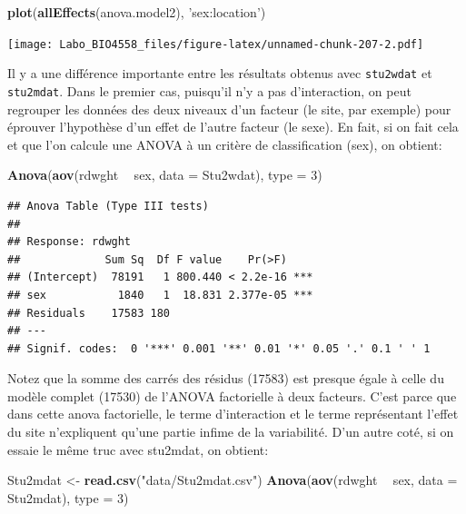 \documentclass[12pt,]{book}
\newenvironment{Shaded}{\begin{snugshade}}{\end{snugshade}}
\newcommand{\DataTypeTok}[1]{\textcolor[rgb]{0.27,0.27,0.27}{#1}}
\newcommand{\DecValTok}[1]{\textcolor[rgb]{0.06,0.06,0.06}{#1}}
\newcommand{\KeywordTok}[1]{\textcolor[rgb]{0.27,0.27,0.27}{\textbf{#1}}}
\newcommand{\NormalTok}[1]{#1}
\newcommand{\OperatorTok}[1]{\textcolor[rgb]{0.43,0.43,0.43}{\textbf{#1}}}
\newcommand{\StringTok}[1]{\textcolor[rgb]{0.5,0.5,0.5}{#1}}
\begin{document}
\begin{Shaded}
\begin{Highlighting}[]
\KeywordTok{plot}\NormalTok{(}\KeywordTok{allEffects}\NormalTok{(anova.model2), }\StringTok{'sex:location'}\NormalTok{)}
\end{Highlighting}
\end{Shaded}

\texttt{[image: Labo\_BIO4558\_files/figure-latex/unnamed-chunk-207-2.pdf]}

Il y a une différence importante entre les résultats obtenus avec \texttt{stu2wdat} et \texttt{stu2mdat}. Dans le premier cas, puisqu'il n'y a pas d'interaction, on peut regrouper les données des deux niveaux d'un facteur (le site, par exemple) pour éprouver l'hypothèse d'un effet de l'autre facteur (le sexe). En fait, si on fait cela et que l'on calcule une ANOVA à un critère de classification (sex), on obtient:

\begin{Shaded}
\begin{Highlighting}[]
\KeywordTok{Anova}\NormalTok{(}\KeywordTok{aov}\NormalTok{(rdwght }\OperatorTok{~}\StringTok{ }\NormalTok{sex, }\DataTypeTok{data =}\NormalTok{ Stu2wdat), }\DataTypeTok{type =} \DecValTok{3}\NormalTok{)}
\end{Highlighting}
\end{Shaded}

\begin{verbatim}
## Anova Table (Type III tests)
## 
## Response: rdwght
##             Sum Sq  Df F value    Pr(>F)    
## (Intercept)  78191   1 800.440 < 2.2e-16 ***
## sex           1840   1  18.831 2.377e-05 ***
## Residuals    17583 180                      
## ---
## Signif. codes:  0 '***' 0.001 '**' 0.01 '*' 0.05 '.' 0.1 ' ' 1
\end{verbatim}

Notez que la somme des carrés des résidus (17583) est presque égale à celle du modèle complet (17530) de l'ANOVA factorielle à deux facteurs. C'est parce que dans cette anova factorielle, le terme d'interaction et le terme représentant l'effet du site n'expliquent qu'une partie infime de la variabilité. D'un autre coté, si on essaie le même truc avec stu2mdat, on obtient:

\begin{Shaded}
\begin{Highlighting}[]
\NormalTok{Stu2mdat <-}\StringTok{ }\KeywordTok{read.csv}\NormalTok{(}\StringTok{"data/Stu2mdat.csv"}\NormalTok{)}
\KeywordTok{Anova}\NormalTok{(}\KeywordTok{aov}\NormalTok{(rdwght }\OperatorTok{~}\StringTok{ }\NormalTok{sex, }\DataTypeTok{data =}\NormalTok{ Stu2mdat), }\DataTypeTok{type =} \DecValTok{3}\NormalTok{)}
\end{Highlighting}
\end{Shaded}
\end{document}
